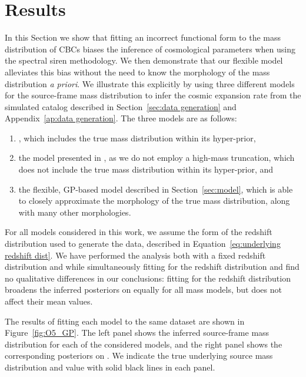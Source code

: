 \documentclass[preprint2,linenumbers]{aastex631}
\begin{document}
\section{Results}
\label{sec:results}
In this Section we show that fitting an incorrect functional form to the mass distribution of \acp{CBC} biases the inference of cosmological parameters when using the spectral siren methodology.
We then demonstrate that our flexible model alleviates this bias without the need to know the morphology of the mass distribution \emph{a priori}.
We illustrate this explicitly by using three different models for the source-frame mass distribution to infer the cosmic expansion rate from the simulated catalog described in Section~\ref{sec:data generation} and Appendix~\ref{ap:data generation}.
The three models are as follows:
\begin{enumerate}
    \item \plp{}, which includes the true mass distribution within its hyper-prior,
    \item the \bpl{} model presented in \citet{abbott_population_2021}, as we do not employ a high-mass truncation, which does not include the true mass distribution within its hyper-prior, and 
    \item the flexible, \ac{GP}-based model described in Section~\ref{sec:model}, which is able to closely approximate the morphology of the true mass distribution, along with many other morphologies.
\end{enumerate}
For all models considered in this work, we assume the form of the redshift distribution used to generate the data, described in Equation~\ref{eq:underlying redshift dist}.
We have performed the analysis both with a fixed redshift distribution and while simultaneously fitting for the redshift distribution and find no qualitative differences in our conclusions: fitting for the redshift distribution broadens the inferred posteriors on \Ho{} equally for all mass models, but does not affect their mean values.

The results of fitting each model to the same dataset are shown in Figure~\ref{fig:O5_GP}.
The left panel shows the inferred source-frame mass distribution for each of the considered models, and the right panel shows the corresponding posteriors on \Ho{}. 
We indicate the true underlying source mass distribution and \Ho{} value with solid black lines in each panel.
\end{document}

